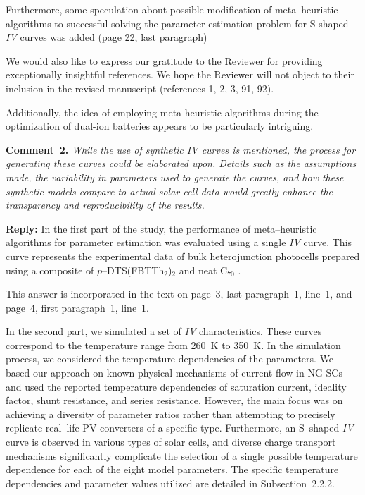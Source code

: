 \documentclass[a4paper,fleqn]{cas-sc}
\begin{document}
Furthermore, some speculation about possible modification of meta--heuristic algorithms
to successful solving the parameter estimation problem for S-shaped \emph{IV} curves was added 
(page 22, last paragraph)

We would also like to express our gratitude to the Reviewer for providing exceptionally insightful references.
We hope the Reviewer will not object to their inclusion in the revised manuscript (references 1, 2, 3, 91, 92).

Additionally, the idea of employing meta-heuristic algorithms during the optimization of dual-ion batteries appears to be particularly intriguing.



\vspace{1cm}
\noindent
\textcolor[rgb]{0.00,0.50,1.00}{\textbf{Comment~2.}}
\emph{While the use of synthetic IV curves is mentioned, the process for generating
these curves could be elaborated upon.
Details such as the assumptions made, the variability in parameters used to generate the curves,
and how these synthetic models compare to actual solar cell data would greatly enhance the transparency and reproducibility of the results.}

\noindent
\textcolor[rgb]{0.51,0.00,0.00}{\textbf{Reply:}}
In the first part of the study, the performance of meta--heuristic algorithms for parameter estimation was evaluated using a single \emph{IV} curve.
This curve represents the experimental data of bulk heterojunction photocells prepared
using a composite of $p$--DTS(FBTTh$_2$)$_2$ and neat C$_{70}$ \cite{Tada2015Organic}.

This answer is incorporated in the text on page~3, last paragraph~1, line~1,
and page~4, first paragraph~1, line~1.

In the second part, we simulated a set of \emph{IV} characteristics.
These curves correspond to the temperature range from 260~K to 350~K.
In the simulation process, we considered the temperature dependencies of the parameters.
We based our approach on known physical mechanisms of current flow in NG-SCs and
used the reported temperature dependencies of saturation current, ideality factor, shunt resistance, and series resistance.
However, the main focus was on achieving a diversity of parameter ratios rather
than attempting to precisely replicate real--life PV converters of a specific type.
Furthermore, an S--shaped \emph{IV} curve is observed in various types of solar cells,
and diverse charge transport mechanisms significantly complicate the selection of a single possible temperature dependence for each of the eight model parameters.
The specific temperature dependencies and parameter values utilized are detailed in Subsection~2.2.2.
\end{document}
